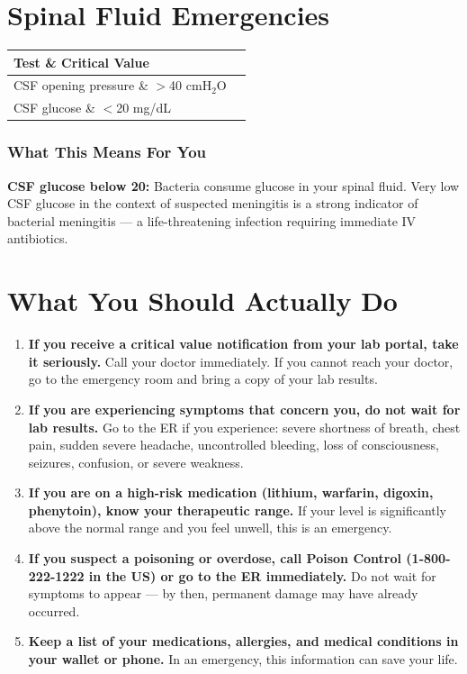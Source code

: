 \clearpage
\section{Spinal Fluid Emergencies}

\begin{longtable}{@{}ll@{}}
\toprule
\textbf{Test} \& \textbf{Critical Value} \\
\midrule
CSF opening pressure \& $>$40 cmH$_2$O \\
CSF glucose \& $<$20 mg/dL \\
\bottomrule
\end{longtable}

\subsubsection{What This Means For You}

\textbf{CSF glucose below 20:} Bacteria consume glucose in your spinal fluid. Very low CSF glucose in the context of suspected meningitis is a strong indicator of bacterial meningitis --- a life-threatening infection requiring immediate IV antibiotics.

\clearpage
\section{What You Should Actually Do}

\begin{enumerate}
    \item \textbf{If you receive a critical value notification from your lab portal, take it seriously.} Call your doctor immediately. If you cannot reach your doctor, go to the emergency room and bring a copy of your lab results.

    \item \textbf{If you are experiencing symptoms that concern you, do not wait for lab results.} Go to the ER if you experience: severe shortness of breath, chest pain, sudden severe headache, uncontrolled bleeding, loss of consciousness, seizures, confusion, or severe weakness.

    \item \textbf{If you are on a high-risk medication (lithium, warfarin, digoxin, phenytoin), know your therapeutic range.} If your level is significantly above the normal range and you feel unwell, this is an emergency.

    \item \textbf{If you suspect a poisoning or overdose, call Poison Control (1-800-222-1222 in the US) or go to the ER immediately.} Do not wait for symptoms to appear --- by then, permanent damage may have already occurred.

    \item \textbf{Keep a list of your medications, allergies, and medical conditions in your wallet or phone.} In an emergency, this information can save your life.
\end{enumerate}
